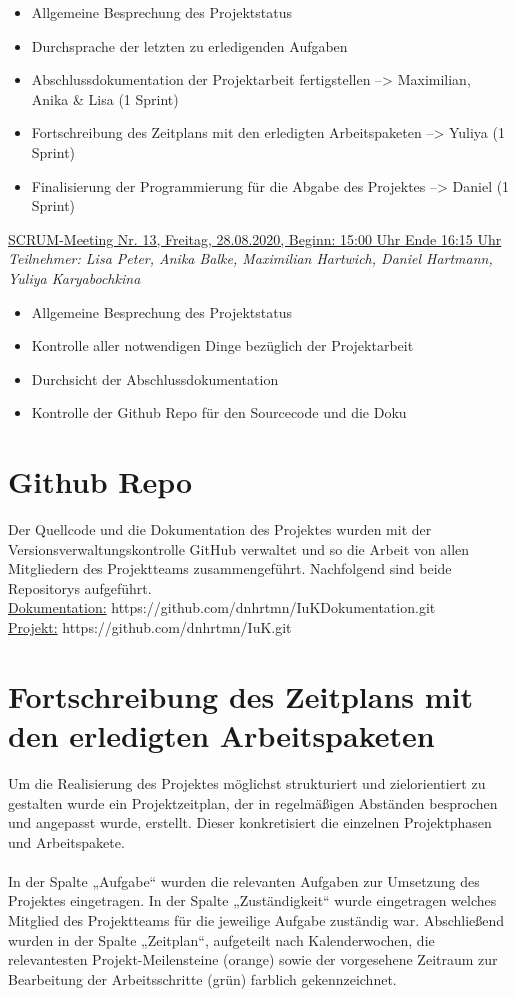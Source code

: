\documentclass[a4paper,report,headsepline]{scrreprt}
\begin{document}
\begin{itemize}
\item Allgemeine Besprechung des Projektstatus 
\item Durchsprache der letzten zu erledigenden Aufgaben 
\item Abschlussdokumentation der Projektarbeit fertigstellen --> Maximilian, Anika \& Lisa (1 Sprint) 
\item Fortschreibung des Zeitplans mit den erledigten Arbeitspaketen --> Yuliya (1 Sprint) 
\item Finalisierung der Programmierung für die Abgabe des Projektes --> Daniel (1 Sprint) 
\end{itemize}
\underline{{\large SCRUM-Meeting Nr. 13, Freitag, 28.08.2020, Beginn: 15:00 Uhr Ende 16:15 Uhr}} \\
\textit{Teilnehmer: Lisa Peter, Anika Balke, Maximilian Hartwich, Daniel Hartmann, Yuliya Karyabochkina}

\begin{itemize}
\item Allgemeine Besprechung des Projektstatus 
\item Kontrolle aller notwendigen Dinge bezüglich der Projektarbeit 
\item Durchsicht der Abschlussdokumentation 
\item Kontrolle der Github Repo für den Sourcecode und die Doku 
\end{itemize}
     
\chapter{Github Repo}
Der Quellcode und die Dokumentation des Projektes wurden mit der Versionsverwaltungskontrolle GitHub verwaltet und so die Arbeit von allen Mitgliedern des Projektteams zusammengeführt. Nachfolgend sind beide Repositorys aufgeführt.\\
\underline{Dokumentation:} https://github.com/dnhrtmn/IuKDokumentation.git \\
\underline{Projekt:} https://github.com/dnhrtmn/IuK.git
\chapter{Fortschreibung des Zeitplans mit den erledigten Arbeitspaketen}
Um die Realisierung des Projektes möglichst strukturiert und zielorientiert zu gestalten wurde ein Projektzeitplan, der in regelmäßigen Abständen besprochen und angepasst wurde, erstellt. Dieser konkretisiert die einzelnen Projektphasen und Arbeitspakete. \\ 
\\
In der Spalte „Aufgabe“ wurden die relevanten Aufgaben zur Umsetzung des Projektes eingetragen. In der Spalte „Zuständigkeit“ wurde eingetragen welches Mitglied des Projektteams für die jeweilige Aufgabe zuständig war. Abschließend wurden in der Spalte „Zeitplan“, aufgeteilt nach Kalenderwochen, die relevantesten Projekt-Meilensteine (orange) sowie der vorgesehene Zeitraum zur Bearbeitung der Arbeitsschritte (grün) farblich gekennzeichnet. \\
\end{document}
